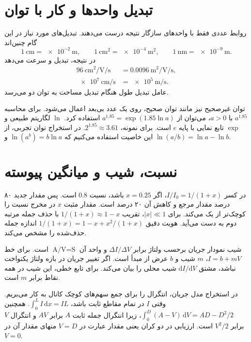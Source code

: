 \section*{تبدیل واحدها و کار با توان}
روابط عددی فقط با واحدهای سازگار نتیجه درست می‌دهند. تبدیل‌های مورد نیاز
در این گام چنین‌اند
\[
 \qty{1}{\centi\metre}=\qty{e-2}{\metre},\qquad
 \qty{1}{\centi\metre\squared}=\qty{e-4}{\metre\squared},\qquad
 \qty{1}{\nano\metre}=\qty{e-9}{\metre}.
\]
در نتیجه، تبدیل  و سرعت می‌دهد
\[
 \begin{aligned}
 \qty{96}{\centi\metre\squared\per\volt\per\second}
 &=\qty{0.0096}{\metre\squared\per\volt\per\second},\\
 \qty{e7}{\centi\metre\per\second}&=\qty{e5}{\metre\per\second}.
 \end{aligned}
\]
عامل تبدیل طول هنگام تبدیل مساحت به توان دو می‌رسد.

توان غیرصحیح نیز مانند توان صحیح، روی یک عدد بی‌بعد اعمال می‌شود.
برای محاسبه \(a^{1.85}\) با \(a>0\)، می‌توان از
\(a^{1.85}=\exp(1.85\ln a)\) استفاده کرد. \(\ln\) لگاریتم طبیعی و
\(\exp\) تابع نمایی با پایه \(e\) است. برای نمونه،
\(2^{1.85}\approx3.61\). در استخراج توان تجربی، از این خاصیت استفاده
می‌کنیم که \(\ln(a^b)=b\ln a\) و \(\ln(a/b)=\ln a-\ln b\).

\section*{نسبت، شیب و میانگین پیوسته}
در کسر \(I/I_0=1/(1+x)\)، اگر \(x=0.25\) باشد، نسبت \(0.8\) است.
پس مقدار جدید ۸۰ درصد مقدار مرجع و کاهش آن ۲۰ درصد است. مقدار مثبت
\(x\) در مخرج نسبت را کوچک‌تر از یک می‌کند. برای \(|x|\ll1\)، تقریب
\(1/(1+x)\approx1-x\) با حذف جمله مرتبه دوم به دست می‌آید. هویت دقیق
\(1/(1+x)=1-x+x^2/(1+x)\) اندازه جمله حذف‌شده را مشخص می‌کند.

شیب نمودار جریان برحسب ولتاژ برابر \(\Delta I/\Delta V\) و واحد آن
\(\unit{\ampere\per\volt}=\unit{\siemens}\) است. برای خط
\(I=b+mV\)، \(m\) شیب و \(b\) عرض از مبدأ است. اگر تغییر جریان در بازه
ولتاژ یکنواخت نباشد، مشتق \(\mathrm{d}I/\mathrm{d}V\) شیب محلی را بیان
می‌کند. برای تابع خطی، این شیب در همه نقاط برابر \(m\) است.

در استخراج مدل جریان، انتگرال را برای جمع سهم‌های کوچک کانال به کار
می‌بریم. وقتی \(I\) در تمام مقاطع ثابت باشد،
\(\int_0^L I\,\mathrm{d}x=IL\). همچنین
\(\int_0^D(A-V)\,\mathrm{d}V=AD-D^2/2\)، زیرا انتگرال جمله ثابت \(A\)
برابر \(AV\) و انتگرال \(V\) برابر \(V^2/2\) است. ارزیابی در دو کران
یعنی مقدار عبارت در \(V=D\) منهای مقدار آن در \(V=0\).
